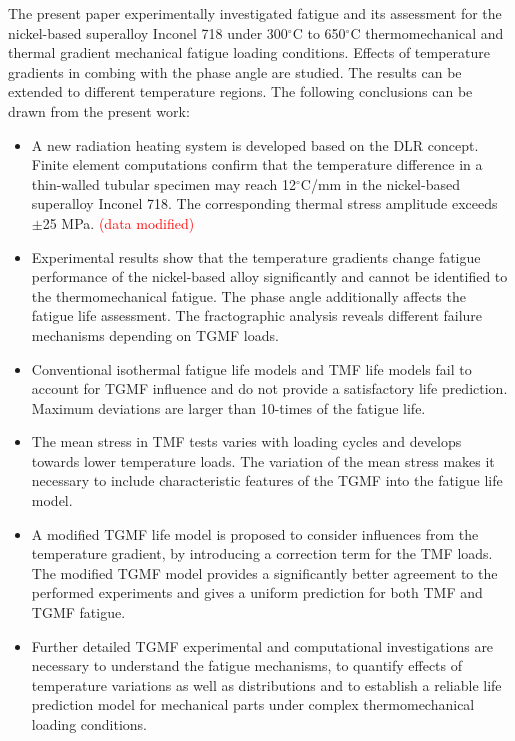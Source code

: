 \documentclass[preprint,5p,twocolumn,10pt,sort&compress]{elsarticle}
\newcommand{\degreeC}{{$^\circ$C}}
\newcommand{\marked}[1]{\textcolor{red}{#1}}
\begin{document}
The present paper experimentally investigated fatigue and its assessment for the nickel-based superalloy Inconel 718 under 300$^\circ$C to 650$^\circ$C thermomechanical and thermal gradient mechanical fatigue loading conditions. Effects of temperature gradients in combing with the phase angle are studied. The results can be extended to different temperature regions. The following conclusions can be drawn from the present work:
\begin{itemize}
\item A new radiation heating system is developed based on the DLR concept. Finite element computations confirm that the temperature difference in a thin-walled tubular specimen may reach 12\degreeC/mm in the nickel-based superalloy Inconel 718. The corresponding thermal stress amplitude exceeds $\pm$25 MPa. \marked{(data modified)}

\item Experimental results show that the temperature gradients change {fatigue performance} of the nickel-based alloy significantly and cannot be identified to the thermomechanical fatigue. The phase angle additionally affects the fatigue life assessment. The fractographic analysis reveals different failure mechanisms depending on TGMF loads.

\item Conventional isothermal fatigue life models and TMF life models fail to account for TGMF influence and do not provide a satisfactory life prediction. Maximum deviations are larger than 10-times of the fatigue life.

\item The mean stress in TMF tests varies with loading cycles and develops towards lower temperature loads. The variation of the mean stress makes it necessary to include characteristic features of the TGMF into the fatigue life model.

\item A modified TGMF life model is proposed to consider influences from the temperature gradient, by introducing a correction term for the TMF loads. The modified TGMF model provides a significantly better agreement to the performed experiments and gives a uniform prediction for both TMF and TGMF fatigue.

\item Further detailed TGMF experimental and computational investigations are necessary to understand the fatigue mechanisms, to quantify effects of temperature variations as well as distributions and to establish a reliable life prediction model for mechanical parts under complex thermomechanical loading conditions.

\end{itemize}
\end{document}
